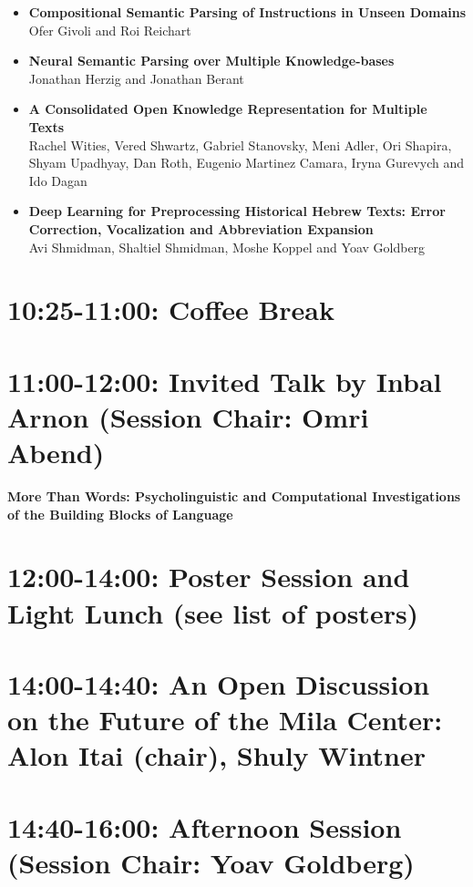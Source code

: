 \documentclass[a0,portrait]{a0poster}
\begin{document}
    \begin{itemize}
        \item
        \textbf{Compositional Semantic Parsing of Instructions in Unseen
        Domains}\\
        Ofer Givoli and Roi Reichart
        \item
        \textbf{Neural Semantic Parsing over Multiple Knowledge-bases}\\
        Jonathan Herzig and Jonathan Berant
        \item
        \textbf{A Consolidated Open Knowledge Representation for Multiple
        Texts}\\
        Rachel Wities, Vered Shwartz, Gabriel Stanovsky, Meni Adler, Ori
        Shapira, Shyam Upadhyay, Dan Roth, Eugenio Martinez Camara, Iryna
        Gurevych and Ido Dagan
        \item
        \textbf{Deep Learning for Preprocessing Historical Hebrew Texts: Error
        Correction, Vocalization and Abbreviation Expansion}\\
        Avi Shmidman, Shaltiel Shmidman, Moshe Koppel and Yoav Goldberg
    \end{itemize}

    \section*{10:25-11:00: Coffee Break}

    \section*{11:00-12:00: Invited Talk by Inbal Arnon (Session Chair: Omri Abend)}
    \textbf{More Than Words: Psycholinguistic and Computational Investigations of the Building Blocks of Language}

    \section*{12:00-14:00: Poster Session and Light Lunch (see list of posters)}

    \section*{14:00-14:40: An Open Discussion on the Future of the Mila Center:
    Alon Itai (chair), Shuly Wintner}

    \section*{14:40-16:00: Afternoon Session (Session Chair: Yoav Goldberg)}
\end{document}
